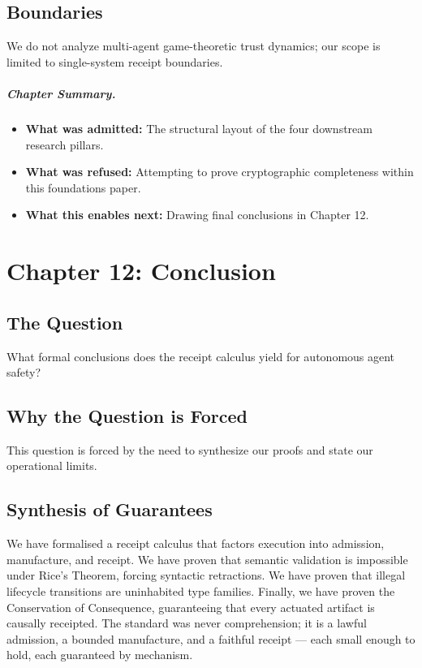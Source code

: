 \documentclass[11pt,oneside]{book}
\theoremstyle{definition}
\theoremstyle{plain}
\theoremstyle{remark}
\begin{document}
\section{Boundaries}
We do not analyze multi-agent game-theoretic trust dynamics; our scope is limited to single-system receipt boundaries. %

\paragraph{Chapter Summary.}
\begin{itemize}
  \item \textbf{What was admitted:} The structural layout of the four downstream research pillars. %
  \item \textbf{What was refused:} Attempting to prove cryptographic completeness within this foundations paper. %
  \item \textbf{What this enables next:} Drawing final conclusions in Chapter 12. %
\end{itemize}

\chapter{Chapter 12: Conclusion}
\label{ch:conclusion}

\section{The Question}
What formal conclusions does the receipt calculus yield for autonomous agent safety? %

\section{Why the Question is Forced}
This question is forced by the need to synthesize our proofs and state our operational limits. %

\section{Synthesis of Guarantees}
We have formalised a receipt calculus that factors execution into admission, manufacture, and receipt. %
We have proven that semantic validation is impossible under Rice's Theorem, forcing syntactic retractions. %
We have proven that illegal lifecycle transitions are uninhabited type families. %
Finally, we have proven the Conservation of Consequence, guaranteeing that every actuated artifact is causally receipted. %
The standard was never comprehension; it is a lawful admission, a bounded manufacture, and a faithful receipt --- each small enough to hold, each guaranteed by mechanism. %
\end{document}
